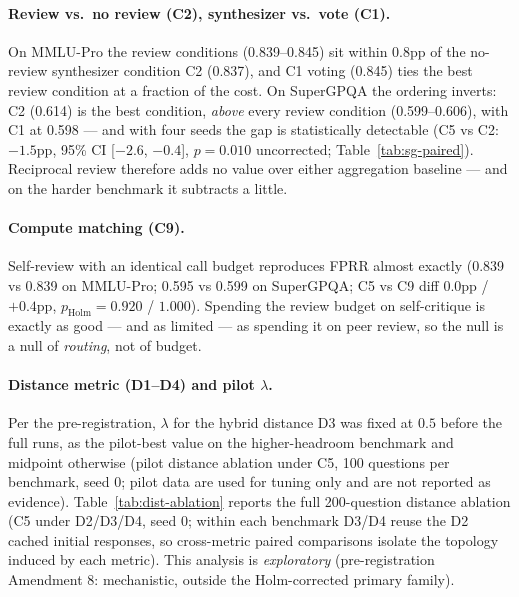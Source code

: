 \documentclass[11pt]{article}
\begin{document}
\paragraph{Review vs.\ no review (C2), synthesizer vs.\ vote (C1).}
On MMLU-Pro the review conditions (0.839--0.845) sit within 0.8pp of the no-review synthesizer condition C2 (0.837), and C1 voting (0.845) ties the best review condition at a fraction of the cost. On SuperGPQA the ordering inverts: C2 (0.614) is the best condition, \emph{above} every review condition (0.599--0.606), with C1 at 0.598 --- and with four seeds the gap is statistically detectable (C5 vs C2: $-1.5$pp, 95\% CI [$-2.6$, $-0.4$], $p=0.010$ uncorrected; Table~\ref{tab:sg-paired}). Reciprocal review therefore adds no value over either aggregation baseline --- and on the harder benchmark it subtracts a little.

\paragraph{Compute matching (C9).}
Self-review with an identical call budget reproduces FPRR almost exactly (0.839 vs 0.839 on MMLU-Pro; 0.595 vs 0.599 on SuperGPQA; C5 vs C9 diff $0.0$pp / $+0.4$pp, $p_{\mathrm{Holm}} = 0.920$ / $1.000$). Spending the review budget on self-critique is exactly as good --- and as limited --- as spending it on peer review, so the null is a null of \emph{routing}, not of budget.

\paragraph{Distance metric (D1--D4) and pilot $\lambda$.}
Per the pre-registration, $\lambda$ for the hybrid distance D3 was fixed at $0.5$ before the full runs, as the pilot-best value on the higher-headroom benchmark and midpoint otherwise (pilot distance ablation under C5, 100 questions per benchmark, seed 0; pilot data are used for tuning only and are not reported as evidence). Table~\ref{tab:dist-ablation} reports the full 200-question distance ablation (C5 under D2/D3/D4, seed 0; within each benchmark D3/D4 reuse the D2 cached initial responses, so cross-metric paired comparisons isolate the topology induced by each metric). This analysis is \emph{exploratory} (pre-registration Amendment 8: mechanistic, outside the Holm-corrected primary family).
\end{document}
